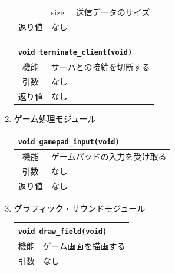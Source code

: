 \documentclass{jarticle}
\begin{document}
\begin{enumerate}
\begin{table}[H]
\begin{center}
\begin{tabular}{|c|p{3em}p{30em}|}
            & size & 送信データのサイズ\\
            返り値 & なし & \\ \hline
          \end{tabular}
        \end{center}
      \end{table}
%
      \begin{table}[H]
        \begin{center}
          \begin{tabular}{|c|p{3em}p{30em}|} \hline
            \multicolumn{3}{|l|}{{\tt void terminate\_client(void)}}\\ \hline \hline
            機能 & \multicolumn{2}{|l|}{サーバとの接続を切断する}\\
            引数 & なし & \\
            返り値 & なし &\\ \hline
          \end{tabular}
        \end{center}
      \end{table}
%
\item ゲーム処理モジュール\\
      \begin{table}[H]
        \begin{center}
          \begin{tabular}{|c|p{3em}p{30em}|} \hline
            \multicolumn{3}{|l|}{{\tt void gamepad\_input(void)}}\\ \hline \hline
            機能 & \multicolumn{2}{|l|}{ゲームパッドの入力を受け取る}\\
            引数 & なし & \\
            返り値 & なし & \\ \hline
          \end{tabular}
        \end{center}
      \end{table}
%
\item グラフィック・サウンドモジュール\\
      \begin{table}[H]
        \begin{center}
          \begin{tabular}{|c|p{3em}p{30em}|} \hline
            \multicolumn{3}{|l|}{{\tt void draw\_field(void)}}\\ \hline \hline
            機能 & \multicolumn{2}{|l|}{ゲーム画面を描画する}\\
            引数 & なし & \\

\end{tabular}
\end{center}
\end{table}
\end{enumerate}
\end{document}
